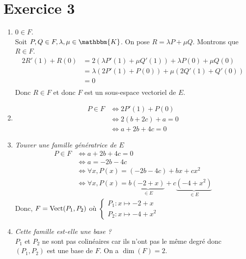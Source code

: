 \part{Exercice 3}
\begin{enumerate}
	\item $0 \in F$.\\
		Soit $P, Q \in F, \lambda, \mu \in \mathbbm{K}$. On pose $R = \lambda P + \mu Q$. Montrons que $R \in F$.
		\begin{align*}
			2R'(1) + R(0)
			&= 2(\lambda P'(1) + \mu Q'(1)) + \lambda P(0) + \mu Q(0) \\
			&= \lambda (2P'(1) + P(0)) + \mu (2Q'(1) + Q'(0)) \\
			&= 0 \\
		\end{align*}
		Donc $R \in F$ et donc $F$ est un sous-espace vectoriel de $E$.
	\item
		\begin{align*}
			P \in F &\iff 2P'(1) + P(0)\\
							&\iff 2(b+2c) + a = 0\\
							&\iff a+2b+4c = 0
		\end{align*}
	\item {\itshape Touver une famille génératrice de $E$}\\
		\begin{align*}
			P \in F &\iff a + 2b + 4c = 0\\
							&\iff a = -2b - 4c\\
							&\iff \forall x, P(x) = (-2b-4c)+bx+cx^2\\
							&\iff \forall x, P(x) = b\underbrace{(-2+x)}_{\in E} + c\underbrace{(-4+x^2)}_{\in E}
		\end{align*}
		Donc, $F = \operatorname{Vect}(P_1, P_2)$ où $\begin{cases}
			P_1: x\mapsto -2+x\\
			P_2: x\mapsto -4 + x^2
		\end{cases}$ \\
	\item {\itshape Cette famille est-elle une base ?}\\
		$P_1$ et $P_2$ ne sont pas colinéaires car ils n'ont pas le même degré donc $(P_1,P_2)$ est une base de $F$. On a $\dim(F) = 2$.
\end{enumerate}
